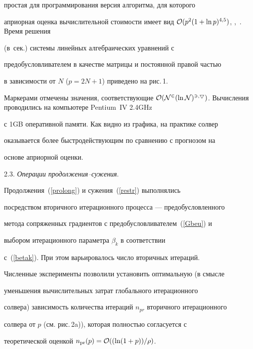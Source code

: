 простая для программирования версия алгоритма, для которого


априорная оценка вычислительной стоимости имеет вид ${\mc O}(p^2(1+\ln


p)^{4{,}5})$, \cite{K2001},~\cite{K2002}. Время решения


(в~сек.) системы линейных алгебраических уравнений с


предобусловливателем в качестве матрицы и постоянной правой частью


в зависимости от $N$ ($p=2N+1$) приведено на рис.\,1.


Маркерами отмечены значения, соответствующие $\cal O (N^2 (\ln


N)^{3{,}5})$. Вычисления проводились на компьютере Pentium~IV 2.4\;GHz


с 1\;GB оперативной памяти. Как видно из графика, на практике солвер


оказывается более быстродействующим по сравнению с прогнозом на


основе априорной оценки.


\medskip





2.3. {\it Операции продолжения--сужения}.


Продолжения~(\ref{prolong}) и сужения~(\ref{restr}) выполнялись 


посредством вторичного итерационного процесса --- предобусловленного 


метода сопряженных градиентов с предобусловливателем~(\ref{Gbeu}) и 


выбором итерационного параметра $\beta_k$ в соответствии


с~(\ref{betak}). При этом варьировалось число вторичных итераций. 


Численные эксперименты позволили установить оптимальную (в смысле 


уменьшения вычислительных затрат глобального итерационного


солвера) зависимость количества итераций $n_{pr}$ вторичного итерационного 


солвера от $p$ (см. рис.\,2a)), которая полностью согласуется с 


теоретической оценкой $n_{\mathrm{pr}}(p)={\mc


O}((\ln (1+p))/\rho)$.







